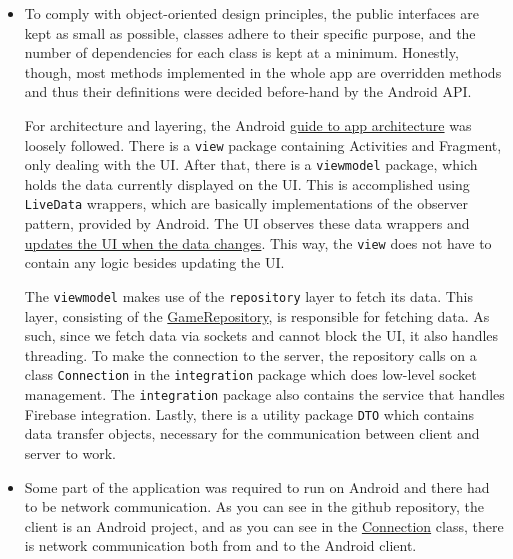 \documentclass[a4paper]{scrartcl}
\def\code#1{\texttt{#1}}
\begin{document}
\begin{itemize}
    \item To comply with object-oriented design principles, the public interfaces are kept as small as possible, classes adhere to their specific purpose, and the number of dependencies for each class is kept at a minimum. Honestly, though, most methods implemented in the whole app are overridden methods and thus their definitions were decided before-hand by the Android API. 
        
        For architecture and layering, the Android \href{https://developer.android.com/jetpack/docs/guide}{guide to app architecture} was loosely followed. There is a \code{view} package containing Activities and Fragment, only dealing with the UI. After that, there is a \code{viewmodel} package, which holds the data currently displayed on the UI. This is accomplished using \code{LiveData} wrappers, which are basically implementations of the observer pattern, provided by Android. The UI observes these data wrappers and \href{https://github.com/fongie/AndroidHangman/blob/master/app/src/main/java/se/kth/korlinge/androidhangman/view/CurrentGameFragment.java#L80}{updates the UI when the data changes}. This way, the \code{view} does not have to contain any logic besides updating the UI.

        The \code{viewmodel} makes use of the \code{repository} layer to fetch its data. This layer, consisting of the \href{https://github.com/fongie/AndroidHangman/blob/master/app/src/main/java/se/kth/korlinge/androidhangman/repository/GameRepository.java}{GameRepository}, is responsible for fetching data. As such, since we fetch data via sockets and cannot block the UI, it also handles threading. To make the connection to the server, the repository calls on a class \code{Connection} in the \code{integration} package which does low-level socket management. The \code{integration} package also contains the service that handles Firebase integration. Lastly, there is a utility package \code{DTO} which contains data transfer objects, necessary for the communication between client and server to work.

    \item Some part of the application was required to run on Android and there had to be network communication. As you can see in the github repository, the client is an Android project, and as you can see in the \href{https://github.com/fongie/AndroidHangman/blob/master/app/src/main/java/se/kth/korlinge/androidhangman/integration/Connection.java}{Connection} class, there is network communication both from and to the Android client.


\end{itemize}
\end{document}
